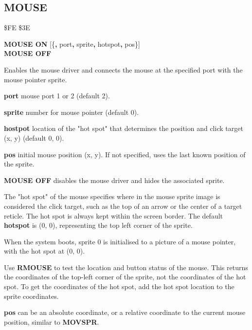 \subsection{MOUSE}
\begin{description}[leftmargin=2cm,style=nextline]
\item [Token:]    \$FE \$3E

\item [Format:]   {\bf MOUSE ON} [\{{\bf,} port{\bf,} sprite{\bf,} hotspot{\bf,} pos\}] \\
                  {\bf MOUSE OFF}

\item [Usage:]    Enables the mouse driver and connects the mouse at the specified port with the mouse pointer sprite.

                  {\bf port} mouse port 1 or 2 (default 2).

                  {\bf sprite} number for mouse pointer (default 0).

                  {\bf hostpot} location of the "hot spot" that determines the position and click target (x, y) (default 0, 0).

                  {\bf pos} initial mouse position (x, y). If not specified, uses the last known position of the sprite.

                  {\bf MOUSE OFF} disables the mouse driver and hides the associated sprite.

\item [Remarks:]  The "hot spot" of the mouse specifies where in the mouse sprite image is considered the click target, such as the top of an arrow or the center of a target reticle. The hot spot is always kept within the screen border. The default {\bf hotspot} is (0, 0), representing the top left corner of the sprite.

                  When the system boots, sprite 0 is initialised to a picture of a mouse pointer, with the hot spot at (0, 0).

                  Use {\bf RMOUSE} to test the location and button status of the mouse. This returns the coordinates of the top-left corner of the sprite, not the coordinates of the hot spot. To get the coordinates of the hot spot, add the hot spot location to the sprite coordinates.

                  {\bf pos} can be an absolute coordinate, or a relative coordinate to the current mouse position, similar to {\bf MOVSPR}.


\end{description}
